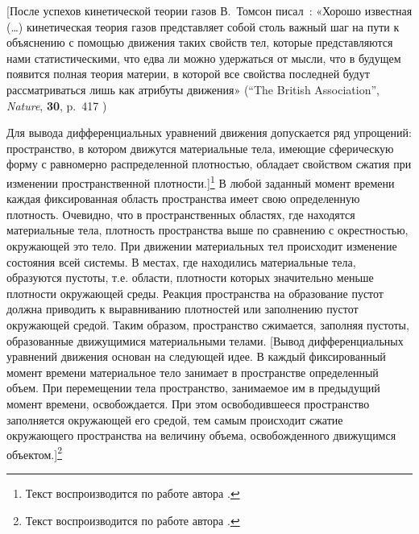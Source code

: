 [После успехов кинетической теории газов В.~Томсон писал~\cite{zaus:10}: «Хорошо известная (\dots) кинетическая теория газов представляет собой столь важный шаг на пути к объяснению с помощью движения таких свойств тел, которые представляются нами статистическими, что едва ли можно удержаться от мысли, что в будущем появится полная теория материи, в которой все свойства последней будут рассматриваться лишь как атрибуты движения» (``The British Association'', {\it Nature}, {\bf 30}, p.~417 )



Для вывода дифференциальных уравнений движения допускается ряд упрощений: пространство, в котором движутся материальные тела, имеющие сферическую форму с равномерно распределенной плотностью, обладает свойством сжатия при изменении пространственной плотности.]\footnote{Текст воспроизводится  по работе автора  \cite{zaus:13}.} В любой заданный момент времени каждая фиксированная область пространства имеет свою определенную плотность. Очевидно, что в пространственных областях, где находятся материальные тела, плотность пространства выше по сравнению с окрестностью, окружающей это тело. При движении материальных тел происходит изменение состояния всей системы. В местах, где находились материальные тела, образуются пустоты, т.е. области, плотности которых значительно меньше плотности окружающей среды. Реакция пространства на образование пустот должна приводить к выравниванию плотностей или заполнению пустот окружающей средой. Таким образом, пространство сжимается, заполняя пустоты, образованные движущимися материальными телами.
[Вывод дифференциальных уравнений движения основан на следующей идее. В каждый фиксированный момент времени материальное тело занимает в пространстве определенный объем. 
При перемещении тела пространство, занимаемое им в предыдущий момент времени, освобождается. При этом освободившееся пространство заполняется окружающей его средой, тем самым происходит сжатие окружающего пространства на величину объема, освобожденного движущимся объектом.]\footnote{Текст воспроизводится  по работе автора  \cite{zaus:13}.}

%
%

